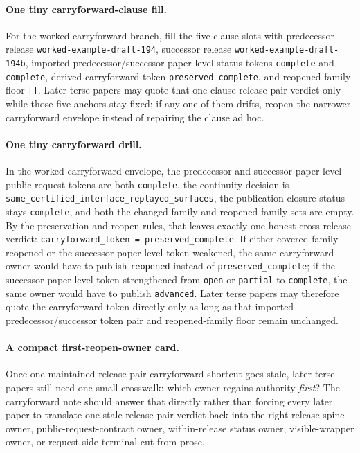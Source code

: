 \documentclass[11pt]{article}
\begin{document}
\paragraph{One tiny carryforward-clause fill.}
For the worked carryforward branch, fill the five clause slots with predecessor release \texttt{worked-example-draft-194}, successor release \texttt{worked-example-draft-194b}, imported predecessor/successor paper-level status tokens \texttt{complete} and \texttt{complete}, derived carryforward token \texttt{preserved\_complete}, and reopened-family floor \texttt{[]}. Later terse papers may quote that one-clause release-pair verdict only while those five anchors stay fixed; if any one of them drifts, reopen the narrower carryforward envelope instead of repairing the clause ad hoc.\cite{series:workedexample}

\paragraph{One tiny carryforward drill.}
In the worked carryforward envelope, the predecessor and successor paper-level public request tokens are both \texttt{complete}, the continuity decision is \texttt{same\_certified\_interface\_replayed\_surfaces}, the publication-closure status stays \texttt{complete}, and both the changed-family and reopened-family sets are empty. By the preservation and reopen rules, that leaves exactly one honest cross-release verdict: \texttt{carryforward\_token = preserved\_complete}. If either covered family reopened or the successor paper-level token weakened, the same carryforward owner would have to publish \texttt{reopened} instead of \texttt{preserved\_complete}; if the successor paper-level token strengthened from \texttt{open} or \texttt{partial} to \texttt{complete}, the same owner would have to publish \texttt{advanced}. Later terse papers may therefore quote the carryforward token directly only as long as that imported predecessor/successor token pair and reopened-family floor remain unchanged.\cite{series:workedexample}

\paragraph{A compact first-reopen-owner card.}
Once one maintained release-pair carryforward shortcut goes stale, later terse papers still need one small crosswalk: which owner regains authority \emph{first}? The carryforward note should answer that directly rather than forcing every later paper to translate one stale release-pair verdict back into the right release-spine owner, public-request-contract owner, within-release status owner, visible-wrapper owner, or request-side terminal cut from prose.
\end{document}
